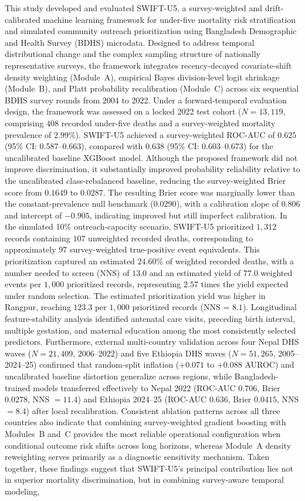 \documentclass[a4paper,fleqn]{cas-sc}
\begin{document}
This study developed and evaluated SWIFT-U5, a survey-weighted and drift-calibrated machine learning framework for under-five mortality risk stratification and simulated community outreach prioritization using Bangladesh Demographic and Health Survey (BDHS) microdata. Designed to address temporal distributional change and the complex sampling structure of nationally representative surveys, the framework integrates recency-decayed covariate-shift density weighting (Module~A), empirical Bayes division-level logit shrinkage (Module~B), and Platt probability recalibration (Module~C) across six sequential BDHS survey rounds from 2004 to 2022. Under a forward-temporal evaluation design, the framework was assessed on a locked 2022 test cohort ($N = 13{,}119$, comprising $408$ recorded under-five deaths and a survey-weighted mortality prevalence of $2.99\%$). SWIFT-U5 achieved a survey-weighted ROC-AUC of $0.625$ (95\% CI: 0.587--0.663), compared with $0.638$ (95\% CI: 0.603--0.673) for the uncalibrated baseline XGBoost model. Although the proposed framework did not improve discrimination, it substantially improved probability reliability relative to the uncalibrated class-rebalanced baseline, reducing the survey-weighted Brier score from $0.1649$ to $0.0287$. The resulting Brier score was marginally lower than the constant-prevalence null benchmark ($0.0290$), with a calibration slope of $0.806$ and intercept of $-0.905$, indicating improved but still imperfect calibration. In the simulated 10\% outreach-capacity scenario, SWIFT-U5 prioritized $1{,}312$ records containing $107$ unweighted recorded deaths, corresponding to approximately $97$ survey-weighted true-positive event equivalents. This prioritization captured an estimated $24.60\%$ of weighted recorded deaths, with a number needed to screen (NNS) of $13.0$ and an estimated yield of $77.0$ weighted events per $1{,}000$ prioritized records, representing $2.57$ times the yield expected under random selection. The estimated prioritization yield was higher in Rangpur, reaching $123.3$ per $1{,}000$ prioritized records (NNS = $8.1$). Longitudinal feature-stability analysis identified antenatal care visits, preceding birth interval, multiple gestation, and maternal education among the most consistently selected predictors. Furthermore, external multi-country validation across four Nepal DHS waves ($N=21{,}409$, 2006--2022) and five Ethiopia DHS waves ($N=51{,}265$, 2005--2024--25) confirmed that random-split inflation ($+0.071$ to $+0.088$ AUROC) and uncalibrated baseline distortion generalize across regions, while Bangladesh-trained models transferred effectively to Nepal 2022 (ROC-AUC $0.706$, Brier $0.0278$, NNS $=11.4$) and Ethiopia 2024--25 (ROC-AUC $0.636$, Brier $0.0415$, NNS $=8.4$) after local recalibration. Consistent ablation patterns across all three countries also indicate that combining survey-weighted gradient boosting with Modules~B and~C provides the most reliable operational configuration when conditional outcome risk shifts across long horizons, whereas Module~A density reweighting serves primarily as a diagnostic sensitivity mechanism. Taken together, these findings suggest that SWIFT-U5's principal contribution lies not in superior mortality discrimination, but in combining survey-aware temporal modeling, 
\end{document}
